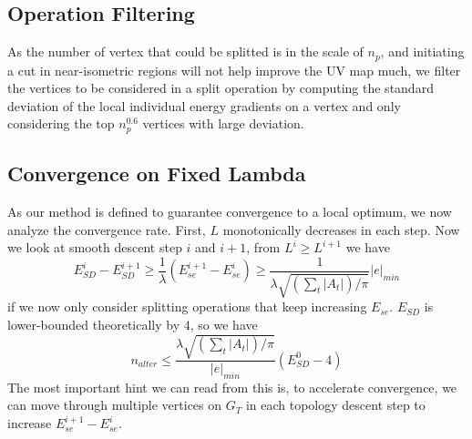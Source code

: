 





\subsection{Operation Filtering}
\label{sec:operationFiltering}
As the number of vertex that could be splitted is in the scale of $n_p$, and initiating a cut in near-isometric regions will not help improve the UV map much, we filter the vertices to be considered in a split operation by computing the standard deviation of the local individual energy gradients on a vertex and only considering the top $n_p^{0.6}$ vertices with large deviation. 

\subsection{Convergence on Fixed Lambda}
\label{sec:convergence}


As our method is defined to guarantee convergence to a local optimum, we now analyze the convergence rate. First, $L$ monotonically decreases in each step. Now we look at smooth descent step $i$ and $i+1$, from $L^i \geq L^{i+1}$ we have
\[ E^i_{SD} - E^{i+1}_{SD} \geq \frac{1}{\lambda} (E^{i+1}_{se} - E^i_{se}) \geq \frac{1}{\lambda\sqrt{(\sum_t |A_t|)/\pi}} |e|_{min} \]
if we now only consider splitting operations that keep increasing $E_{se}$. $E_{SD}$ is lower-bounded theoretically by $4$, so we have
\[ n_{alter} \leq \frac{\lambda\sqrt{(\sum_t |A_t|)/\pi}}{|e|_{min}} (E^0_{SD} - 4) \]
The most important hint we can read from this is, to accelerate convergence, we can move through multiple vertices on $G_T$ in each topology descent step to increase $E^{i+1}_{se} - E^i_{se}$.

 